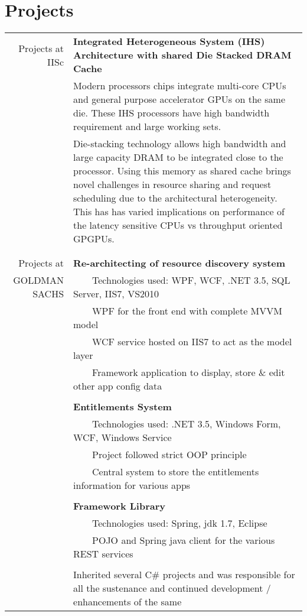 \documentclass[a4paper,10pt]{article} %
\newcommand{\tabitem}{~~\llap{\textbullet}~~}
\begin{document}
\section{Projects}
\begin{tabular}{rp{13cm}}
Projects at IISc& \textbf{Integrated Heterogeneous System (IHS) Architecture with shared Die Stacked DRAM Cache} \\
& \setlength{\leftskip}{0.4cm}
Modern processors chips integrate multi-core CPUs and general purpose accelerator GPUs on the same die. These IHS processors have high bandwidth requirement and large working sets.\\
& \setlength{\leftskip}{0.4cm} 
Die-stacking technology allows high bandwidth and large capacity DRAM to be integrated close to the processor. Using this memory as shared cache brings novel challenges in resource sharing and request scheduling due to the architectural heterogeneity. This has has varied implications on performance of the latency sensitive CPUs vs throughput oriented GPGPUs.\\
&\\
&\\
Projects at  &  \textbf{Re-architecting of resource discovery system} \\
GOLDMAN SACHS &  \tabitem Technologies used: WPF, WCF, .NET 3.5, SQL Server, IIS7, VS2010 \\
& \tabitem WPF for the front end with complete MVVM model\\
& \tabitem WCF service hosted on IIS7 to act as the model layer\\
& \tabitem Framework application to display, store \& edit other app config data \\
&\\
& \textbf{Entitlements System}\\
& \tabitem Technologies used: .NET 3.5, Windows Form, WCF, Windows Service\\
& \tabitem Project followed strict OOP principle\\
& \tabitem Central system to store the entitlements information for various apps\\
&\\
& \textbf{Framework Library} \\
& \tabitem Technologies used: Spring, jdk 1.7, Eclipse\\
& \tabitem POJO and Spring java client for the various REST services \\ 
& \\
& Inherited several C\# projects and was responsible for all the sustenance and continued development / enhancements of the same\\

\end{tabular}
\end{document}
